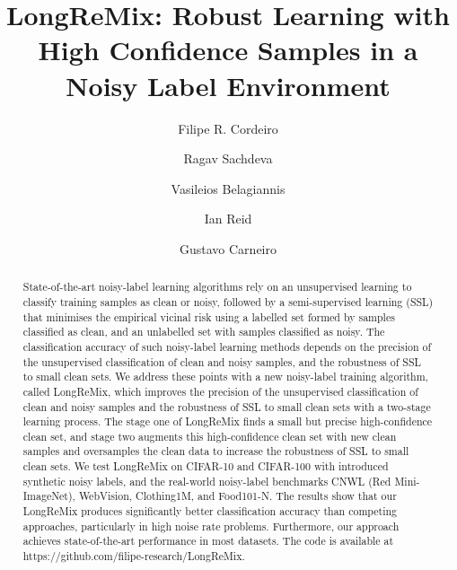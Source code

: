\documentclass[review]{elsarticle}
\begin{document}
\begin{frontmatter}

\title{LongReMix: Robust Learning with High Confidence Samples in a Noisy Label Environment}


\author[ufrpe, pa]{Filipe R. Cordeiro}




\author[vgg]{Ragav Sachdeva}
\author[Magdeburg]{Vasileios Belagiannis}
\author[adelaide]{Ian Reid}
\author[adelaide,surrey]{Gustavo Carneiro}



\address[adelaide]{School of Computer Science, Australian Institute for Machine Learning, Australia}
\address[vgg]{Visual Geometry Group, Department of Engineering Science, University of Oxford, United Kingdom}
\address[ufrpe]{Visual Computing Lab, Department of Computing, Universidade Federal Rural de Pernambuco, Brazil}
\address[Magdeburg]{Otto-von-Guericke-Universit\"at Magdeburg, Germany}
\address[surrey]{Centre for Vision, Speech and Signal Processing, University of Surrey, United Kingdom}

\begin{abstract}
State-of-the-art noisy-label learning algorithms rely on an unsupervised learning to classify training samples as clean or noisy, followed by a semi-supervised learning (SSL) that minimises the empirical vicinal risk using a labelled set formed by samples classified as clean, and an unlabelled set with samples classified as noisy. 
   The classification accuracy of such noisy-label learning methods depends on the precision of the unsupervised classification of clean and noisy samples, and the robustness of SSL to small clean sets. 
   We address these points with a new noisy-label training algorithm, called LongReMix, which improves the precision of the unsupervised classification of clean and noisy samples and the robustness of SSL to small clean sets with a two-stage learning process. The stage one of LongReMix finds a small but precise high-confidence clean set, and stage two augments this high-confidence clean set with new clean samples and oversamples the clean data to increase the robustness of SSL to small clean sets.
We test LongReMix on  CIFAR-10 and CIFAR-100 with introduced synthetic noisy labels, and the real-world noisy-label benchmarks  CNWL (Red Mini-ImageNet), WebVision, Clothing1M, and Food101-N. The results show that our LongReMix produces  significantly better classification accuracy than competing approaches, particularly in high  noise rate problems. Furthermore, our approach achieves state-of-the-art performance in most datasets. The code is available at https://github.com/filipe-research/LongReMix. 
   

\end{abstract}
\end{frontmatter}
\end{document}
